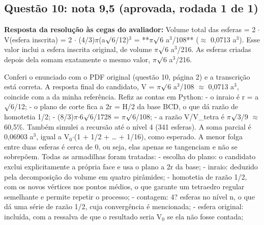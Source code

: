 \documentclass{article}%
\begin{document}
\subsection*{Questão 10: nota 9,5 (aprovada, rodada 1 de 1)}%
\textbf{Resposta da resolução às cegas do avaliador:} Volume total das esferas = 2 $\cdot$ V(esfera inscrita) = 2 $\cdot$ (4/3)$\pi$(a$\surd$6/12)$^3$ = **$\pi$$\surd$6 a$^3$/108** ($\approx$ 0,0713 a$^3$). Esse valor inclui a esfera inscrita original, de volume $\pi$$\surd$6 a$^3$/216. As esferas criadas depois dela somam exatamente o mesmo valor, $\pi$$\surd$6 a$^3$/216.\par %
Conferi o enunciado com o PDF original (questão 10, página 2) e a transcrição está correta. A resposta final do candidato, V = $\pi$$\surd$6 a$^3$/108 $\approx$ 0,0713 a$^3$, coincide com a da minha referência.\newline%
\newline%
Refiz as contas em Python:\newline%
{-} o inraio é r = a$\surd$6/12;\newline%
{-} o plano de corte fica a 2r = H/2 da base BCD, o que dá razão de homotetia 1/2;\newline%
{-} (8/3)$\pi$$\cdot$6$\surd$6/1728 = $\pi$$\surd$6/108;\newline%
{-} a razão V/V\_tetra é $\pi$$\surd$3/9 $\approx$ 60,5\%.\newline%
\newline%
Também simulei a recursão até o nível 4 (341 esferas). A soma parcial é 0,06903 a$^3$, igual a V$_{0}$$\cdot$(1 + 1/2 + \ldots{} + 1/16), como esperado. A menor folga entre duas esferas é cerca de 0, ou seja, elas apenas se tangenciam e não se sobrepõem.\newline%
\newline%
Todas as armadilhas foram tratadas:\newline%
{-} escolha do plano: o candidato exclui explicitamente a própria face e usa o plano a 2r da base;\newline%
{-} inraio: deduzido pela decomposição do volume em quatro pirâmides;\newline%
{-} homotetia de razão 1/2, com os novos vértices nos pontos médios, o que garante um tetraedro regular semelhante e permite repetir o processo;\newline%
{-} contagem: 4? esferas no nível n, o que dá uma série de razão 1/2, cuja convergência é mencionada;\newline%
{-} esfera original: incluída, com a ressalva de que o resultado seria V$_{0}$ se ela não fosse contada;\newline%
\end{document}
